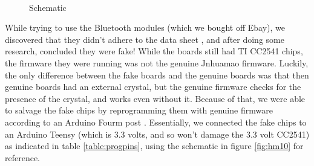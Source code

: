 \documentclass[]{article}
\begin{document}
\begin{figure}
  \centering
  \\
  \caption{Schematic}
  \label{fig:schematic}
\end{figure}

While trying to use the Bluetooth modules (which we bought off Ebay), we discovered that they didn't adhere to the data sheet \cite{jnhuamaodatasheet}, and after doing some research, concluded they were fake!
While the boards still had TI CC2541 chips, the firmware they were running was not the genuine Jnhuamao firmware.
Luckily, the only difference between the fake boards and the genuine boards was that then genuine boards had an external crystal, but the genuine firmware checks for the presence of the crystal, and works even without it. \cite{crystal}
Because of that, we were able to salvage the fake chips by reprogramming them with genuine firmware according to an Arduino Fourm post \cite{crystal}.
Essentially, we connected the fake chips to an Arduino Teensy (which is 3.3 volts, and so won't damage the 3.3 volt CC2541) as indicated in table \ref{table:progpins}, using the schematic in figure \ref{fig:hm10} for reference.
\end{document}
